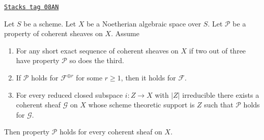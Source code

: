 \begin{lemma}
\label{spaces-cohomology-lemma-property-higher-rank-cohomological-variant}
\href{https://stacks.math.columbia.edu/tag/08AN}{\texttt{Stacks tag 08AN}}

Let $S$ be a scheme. Let $X$ be a Noetherian algebraic space over $S$.
Let $\mathcal{P}$ be a property of coherent sheaves on $X$. Assume
\begin{enumerate}
\item For any short exact sequence of coherent sheaves on $X$
if two out of three have property $\mathcal{P}$ so does the third.
\item If $\mathcal{P}$ holds  for $\mathcal{F}^{\oplus r}$ for
some $r \geq 1$, then it holds for $\mathcal{F}$.
\item For every reduced closed subspace $i : Z \to X$ with
$|Z|$ irreducible there exists a coherent sheaf $\mathcal{G}$ on $X$
whose scheme theoretic support is $Z$ such that $\mathcal{P}$ holds for
$\mathcal{G}$.
\end{enumerate}
Then property $\mathcal{P}$ holds for every coherent sheaf on $X$.
\end{lemma}

